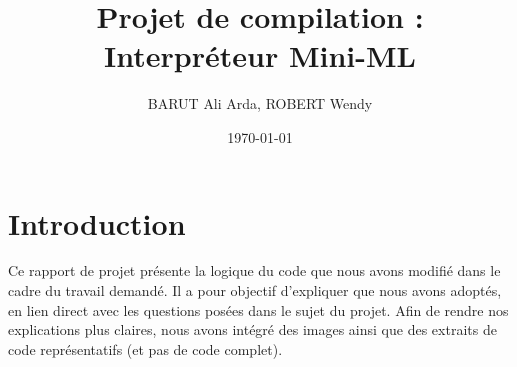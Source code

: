 \documentclass[11pt]{article}
\title{
  Projet de compilation : Interpréteur Mini-ML
}
\author{
  BARUT Ali Arda, ROBERT Wendy
}
\date{\today}
\begin{document}
\maketitle
\tableofcontents
\newpage

\section*{Introduction}
Ce rapport de projet présente la logique du code que nous avons modifié dans le cadre du travail demandé.
Il a pour objectif d'expliquer que nous avons adoptés, en lien direct avec les questions posées dans le sujet du projet.
Afin de rendre nos explications plus claires, nous avons intégré des images ainsi que des extraits de code représentatifs (et pas de code complet).




\end{document}
